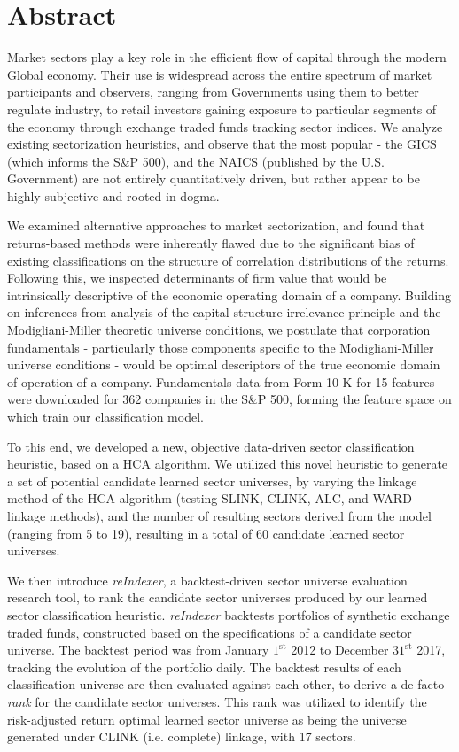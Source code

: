 \documentclass[../main.tex]{subfiles}
\begin{document}
\section*{Abstract}

Market sectors play a key role in the efficient flow of capital through the modern Global economy. Their use is widespread across the entire spectrum of market participants and observers, ranging from Governments using them to better regulate industry, to retail investors gaining exposure to particular segments of the economy through exchange traded funds tracking sector indices. We analyze existing sectorization heuristics, and observe that the most popular - the GICS (which informs the S\&P 500), and the NAICS (published by the U.S. Government) are not entirely quantitatively driven, but rather appear to be highly subjective and rooted in dogma.

We examined alternative approaches to market sectorization, and found that returns-based methods were inherently flawed due to the significant bias of existing classifications on the structure of correlation distributions of the returns. Following this, we inspected determinants of firm value that would be intrinsically descriptive of the economic operating domain of a company. Building on inferences from analysis of the capital structure irrelevance principle and the Modigliani-Miller theoretic universe conditions, we postulate that corporation fundamentals - particularly those components specific to the Modigliani-Miller universe conditions - would be optimal descriptors of the true economic domain of operation of a company. Fundamentals data from Form 10-K for 15 features were downloaded for 362 companies in the S\&P 500, forming the feature space on which train our classification model.

To this end, we developed a new, objective data-driven sector classification heuristic, based on a HCA algorithm. We utilized this novel heuristic to generate a set of potential candidate learned sector universes, by varying the linkage method of the HCA algorithm (testing SLINK, CLINK, ALC, and WARD linkage methods), and the number of resulting sectors derived from the model (ranging from 5 to 19), resulting in a total of 60 candidate learned sector universes.

We then introduce \textit{reIndexer}, a backtest-driven sector universe evaluation research tool, to rank the candidate sector universes produced by our learned sector classification heuristic. \textit{reIndexer} backtests portfolios of synthetic exchange traded funds, constructed based on the specifications of a candidate sector universe. The backtest period was from January $1^\text{st}$ 2012 to December $31^\text{st}$ 2017, tracking the evolution of the portfolio daily. The backtest results of each classification universe are then evaluated against each other, to derive a de facto \textit{rank} for the candidate sector universes. This rank was utilized to identify the risk-adjusted return optimal learned sector universe as being the universe generated under CLINK (i.e. complete) linkage, with 17 sectors.
\end{document}
